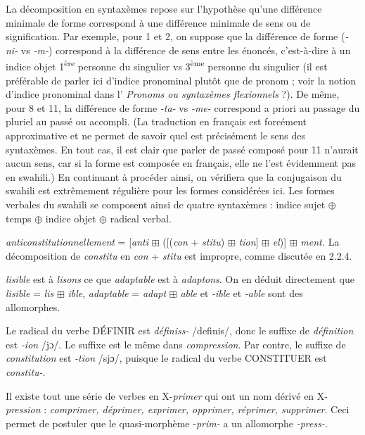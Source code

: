 {     La décomposition en syntaxèmes repose sur l’hypothèse qu’une différence minimale de forme correspond à une différence minimale de sens ou de signification. Par exemple, pour 1 et 2, on suppose que la différence de forme (\textit{{}-ni-} vs \textit{{}-m-}) correspond à la différence de sens entre les énoncés, c’est-à-dire à un indice objet 1\textsuperscript{ère} personne du singulier vs 3\textsuperscript{ème} personne du singulier (il est préférable de parler ici d’indice pronominal plutôt que de pronom ; voir la notion d’indice pronominal dans l’ \textit{Pronoms ou syntaxèmes flexionnels} ?). De même, pour 8 et 11, la différence de forme \textit{{}-ta-} vs \textit{{}-me-} correspond a priori au passage du pluriel au passé ou accompli. (La traduction en français est forcément approximative et ne permet de savoir quel est précisément le sens des syntaxèmes. En tout cas, il est clair que parler de passé composé pour 11 n’aurait aucun sens, car si la forme est composée en français, elle ne l’est évidemment pas en swahili.) En continuant à procéder ainsi, on vérifiera que la conjugaison du swahili est extrêmement régulière pour les formes considérées ici. Les formes verbales du swahili se composent ainsi de quatre syntaxèmes : indice sujet \textrm{${\oplus}$} temps \textrm{${\oplus}$} indice objet \textrm{${\oplus}$} radical verbal.

     \textit{anticonstitutionnellement} = [\textit{anti} \textrm{${\boxplus}$} ([(\textit{con} + \textit{stitu}) \textrm{${\boxplus}$} \textit{tion}] \textrm{${\boxplus}$} \textit{el})] \textrm{${\boxplus}$} \textit{ment.} La décomposition de \textit{constitu} en \textit{con} + \textit{stitu} est impropre, comme discutée en 2.2.4.

     \textit{lisible} est à \textit{lisons} ce que \textit{adaptable} est à \textit{adaptons}. On en déduit directement que \textit{lisible} = \textit{lis} \textrm{${\boxplus}$} \textit{ible}, \textit{adaptable} = \textit{adapt} \textrm{${\boxplus}$} \textit{able} et \textit{{}-ible} et \textit{{}-able} sont des allomorphes.

     Le radical du verbe DÉFINIR est \textit{définiss-} /definis/, donc le suffixe de \textit{définition} est \textit{{}-ion} /jɔ/. Le suffixe est le même dans \textit{compression}. Par contre, le suffixe de \textit{constitution} est \textit{{}-tion} /sjɔ/, puisque le radical du verbe CONSTITUER est \textit{constitu-}.

     Il existe tout une série de verbes en X-\textit{primer} qui ont un nom dérivé en X-\textit{pression} : \textit{comprimer, déprimer, exprimer, opprimer, réprimer, supprimer}. Ceci permet de postuler que le quasi-morphème -\textit{prim-} a un allomorphe \textit{{}-press-}.

}
